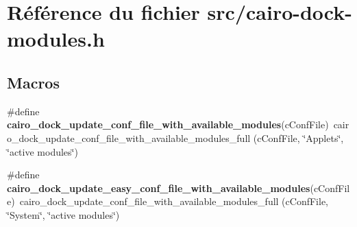 \section{Référence du fichier src/cairo-dock-modules.h}
\label{cairo-dock-modules_8h}
\subsection*{Macros}
\begin{CompactItemize}
\item 
\#define {\bf cairo\_\-dock\_\-update\_\-conf\_\-file\_\-with\_\-available\_\-modules}(cConfFile)~cairo\_\-dock\_\-update\_\-conf\_\-file\_\-with\_\-available\_\-modules\_\-full (cConfFile, \char`\"{}Applets\char`\"{}, \char`\"{}active modules\char`\"{})
\item 
\#define {\bf cairo\_\-dock\_\-update\_\-easy\_\-conf\_\-file\_\-with\_\-available\_\-modules}(cConfFile)~cairo\_\-dock\_\-update\_\-conf\_\-file\_\-with\_\-available\_\-modules\_\-full (cConfFile, \char`\"{}System\char`\"{}, \char`\"{}active modules\char`\"{})
\end{CompactItemize}
